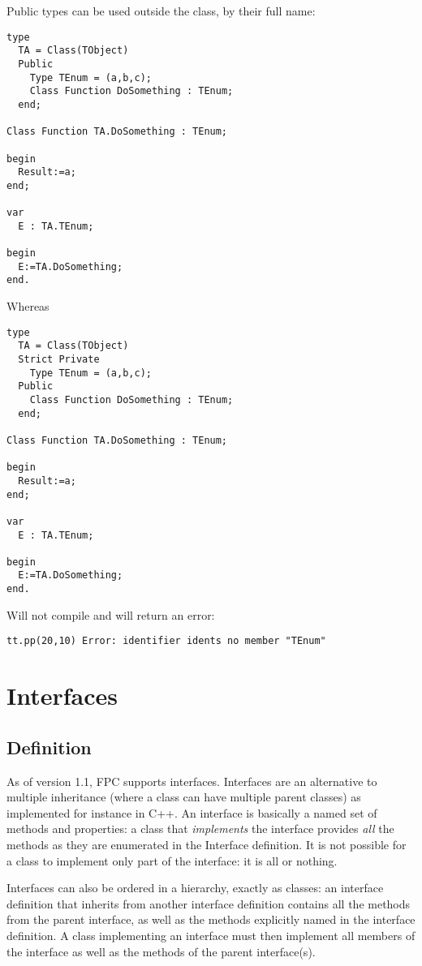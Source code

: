 Public types can be used outside the class, by their full name:
\begin{verbatim}
type
  TA = Class(TObject)
  Public
    Type TEnum = (a,b,c);
    Class Function DoSomething : TEnum;
  end;
  
Class Function TA.DoSomething : TEnum;

begin
  Result:=a;
end;

var
  E : TA.TEnum;
  
begin
  E:=TA.DoSomething;
end.
\end{verbatim}
Whereas
\begin{verbatim}
type
  TA = Class(TObject)
  Strict Private
    Type TEnum = (a,b,c);
  Public
    Class Function DoSomething : TEnum;
  end;
  
Class Function TA.DoSomething : TEnum;

begin
  Result:=a;
end;

var
  E : TA.TEnum;
  
begin
  E:=TA.DoSomething;
end.
\end{verbatim}
Will not compile and will return an error:
\begin{verbatim}
tt.pp(20,10) Error: identifier idents no member "TEnum"
\end{verbatim}

\chapter{Interfaces}
\label{ch:Interfaces}
\section{Definition}
As of version 1.1, FPC supports interfaces. Interfaces are an 
alternative to multiple inheritance (where a class can have multiple
parent classes) as implemented for instance in C++.  An interface is
basically a named set of methods and properties: a class that 
{\em implements} the interface provides {\em all} the methods as 
they are enumerated in the Interface definition. It is not possible for a
class to implement only part of the interface: it is all or nothing.

Interfaces can also be ordered in a hierarchy, exactly as classes:
an interface definition that inherits from another interface definition
contains all the methods from the parent interface, as well as the methods
explicitly named in the interface definition. A class implementing an
interface must then implement all members of the interface as well as the
methods of the parent interface(s).

